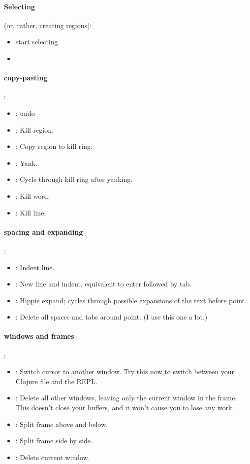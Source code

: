 \paragraph{Selecting} (or, rather, creating regions):
\begin{itemize}
    \item {}  start selecting
    \item 
\end{itemize}

\paragraph{copy-pasting}:
\begin{itemize}
    \item {}: undo
    \item {}:	Kill region.
    \item {}: 	Copy region to kill ring.
    \item {}: 	Yank.
    \item {}: 	Cycle through kill ring after yanking.
    \item {}: 	Kill word.
    \item {}:	Kill line. 
\end{itemize}

\paragraph{spacing and expanding}:
\begin{itemize}
    \item {}: 	Indent line.
    \item {}: 	New line and indent, equivalent to enter followed by tab.
    \item {}: 	Hippie expand; cycles through possible expansions of the text before point.
    \item {}: 	Delete all spaces and tabs around point. (I use this one a lot.) 
\end{itemize}

\paragraph{windows and frames}:
\begin{itemize}
    \item {}: 	Switch cursor to another window. Try this now to switch between your Clojure file and the REPL.
    \item {}: 	Delete all other windows, leaving only the current window in the frame. This doesn’t close your buffers, and it won’t cause you to lose any work.
    \item {}: 	Split frame above and below.
    \item {}: 	Split frame side by side.
    \item {}: 	Delete current window. 
\end{itemize}


